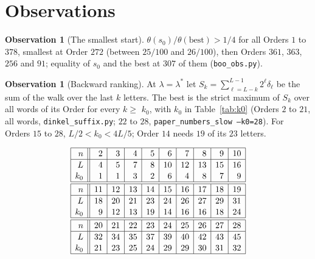 \documentclass[10pt,a4paper,titlepage]{article}
\makeatletter
\newcommand{\termhere}[1]{\leavevmode
  \Hy@raisedlink{\hyper@anchorstart{term:#1}\hyper@anchorend}}
\newcommand{\keysym}[2]{\hyperlink{box:#1}{#2}}
\newenvironment{herefloat}[1]
  {\par\addvspace{\intextsep}\noindent\begin{minipage}{\linewidth}%
   \def\@captype{#1}\centering}
  {\end{minipage}\par\nopagebreak\vspace{\intextsep}}
\theoremstyle{plain}
\theoremstyle{definition}
\newtheorem{observation}[theorem]{Observation}
\theoremstyle{remark}
\makeatother
\begin{document}
\section{Observations}
\label{sec:observations}

\begin{observation}[The smallest start]
$\theta(s_0)/\theta(\text{best}) > 1/4$ for all Orders $1$ to $378$, smallest at Order $272$ (between
$25/100$ and $26/100$), then Orders $361$, $363$, $256$ and $91$; equality of $s_0$ and the best at $307$ of them
(\texttt{boo\_obs.py}).
\end{observation}

\begin{observation}[Backward ranking]
At $\lambda = \lambda^\ast$ let $S_k = \sum_{\ell=L-k}^{L-1} 2^\ell \delta_\ell$ be the sum of the walk over the
last $k$ letters. \termhere{backward}The best is the strict maximum of $S_k$ over all words of its Order for every
$k \ge$ \keysym{backward}{$k_0$}, with $k_0$ in Table~\ref{tab:k0} (Orders $2$ to $21$, all words, \texttt{dinkel\_suffix.py}; $22$ to $28$, \texttt{paper\_numbers\_slow --k0=28}).
For Orders $15$ to $28$, $L/2 < k_0 < 4L/5$; Order $14$ needs $19$ of its $23$ letters.
\end{observation}

\begin{herefloat}{table}
\[
\setlength{\extrarowheight}{1pt}
\begin{array}{|r||r|r|r|r|r|r|r|r|r|}
\hline
n & 2&3&4&5&6&7&8&9&10\\
\hline
L & 4&5&7&8&10&12&13&15&16\\
k_0 & 1&1&3&2&6&4&8&7&9\\
\hline
\hline
n & 11&12&13&14&15&16&17&18&19\\
\hline
L & 18&20&21&23&24&26&27&29&31\\
k_0 & 9&12&13&19&14&16&16&18&24\\
\hline
\hline
n & 20&21&22&23&24&25&26&27&28\\
\hline
L & 32&34&35&37&39&40&42&43&45\\
k_0 & 21&23&25&24&29&29&30&31&32\\
\hline
\end{array}
\]
\caption{Backward ranking: the least $k_0$ from which the best leads the last $k$ letters of the walk.}
\label{tab:k0}
\end{herefloat}
\end{document}
